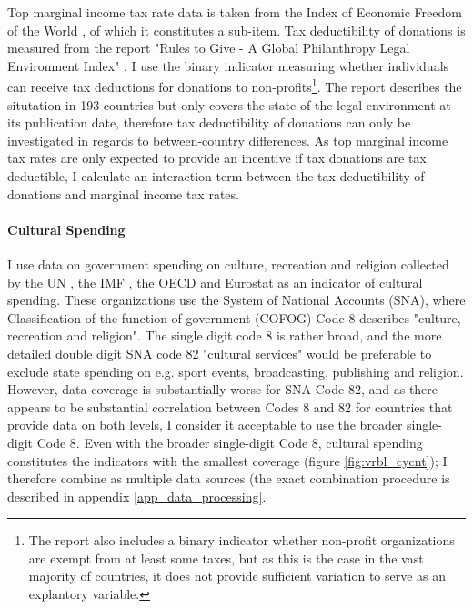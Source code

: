 \documentclass[11pt]{article}
\begin{document}
Top marginal income tax rate data is taken from the Index of Economic Freedom of the World \parencite{Fraser_2022_economic_freedom}, of which it constitutes a sub-item.
Tax deductibility of donations is measured from the report "Rules to Give - A Global Philanthropy Legal Environment Index" \parencite{Quick_Kruse_Pickering_2014_philanthropy}.
I use the binary indicator measuring whether individuals can receive tax deductions for donations to non-profits\footnote{The report also includes a binary indicator whether non-profit organizations are exempt from at least some taxes, but as this is the case in the vast majority of countries, it does not provide sufficient variation to serve as an explantory variable.}.
The report describes the situtation in 193 countries but only covers the state of the legal environment at its publication date, therefore tax deductibility of donations can only be investigated in regards to between-country differences.
As top marginal income tax rates are only expected to provide an incentive if tax donations are tax deductible, I calculate an interaction term between the tax deductibility of donations and marginal income tax rates. 

\paragraph*{Cultural Spending}


I use data on government spending on culture, recreation and religion collected by the UN \parencite{UN_2022_consumption}, the IMF \parencite{IMF_2022_GFS}, the OECD \parencite{OECD_2022_SNA_TABLE11_ARCHIVE,OECD_2022_SNA_TABLE11} and Eurostat \parencite{Eurostat_2022_COFOG} as an indicator of cultural spending.
These organizations use the System of National Accounts (SNA), where Classification of the function of government (COFOG) Code 8 describes "culture, recreation and religion".
The single digit code 8 is rather broad, and the more detailed  double digit SNA code 82 "cultural services" would be preferable to exclude state spending on e.g. sport events, broadcasting, publishing and religion. 
However, data coverage is substantially worse for SNA Code 82, and as there appears to be substantial correlation between Codes 8 and 82 for countries that provide data on both levels, I consider it acceptable to use the broader single-digit Code 8.
Even with the broader single-digit Code 8, cultural spending constitutes the indicators with the smallest coverage (figure \ref{fig:vrbl_cycnt}); I therefore combine as multiple data sources (the exact combination procedure is described in appendix \ref{app_data_processing}.
\end{document}

